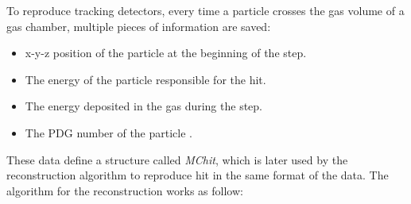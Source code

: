To reproduce tracking detectors, every time a particle crosses the gas volume of a gas chamber, multiple pieces of information are saved:

\begin{itemize}
\item x-y-z position of the particle at the beginning of the step.
\item The energy of the particle responsible for the hit.  
\item The energy deposited in the gas during the step.
\item The PDG number of the particle \cite{particle-numbering-scheme}.
\end{itemize}

These data define a structure called \textit{MChit}, which is later used by the reconstruction algorithm to reproduce hit in the same format of the data. The algorithm for the reconstruction works as follow:
